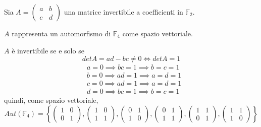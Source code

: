 \documentclass[../main.tex]{subfiles}
\begin{document}
\begin{example}
    Sia $A = \begin{pmatrix}
            a & b \\
            c & d
        \end{pmatrix}$ una matrice invertibile a coefficienti in $\mathbb{F}_2$.

    $A$ rappresenta un automorfismo di $\mathbb{F}_4$ come spazio vettoriale.

    $A$ è invertibile se e solo se
    \begin{equation*}
        det A = ad - bc \neq 0 \iff det A = 1
    \end{equation*}
    \begin{align*}
         & a = 0 \implies bc = 1 \implies b = c = 1 \\
         & b = 0 \implies ad = 1 \implies a = d = 1 \\
         & c = 0 \implies ad = 1 \implies a = d = 1 \\
         & d = 0 \implies bc = 1 \implies b = c = 1
    \end{align*}
    quindi, come spazio vettoriale,
    \begin{equation*}
        Aut(\mathbb{F}_4) = \left\{
        \begin{pmatrix}
            1 & 0 \\
            0 & 1
        \end{pmatrix},
        \begin{pmatrix}
            1 & 0 \\
            1 & 1
        \end{pmatrix},
        \begin{pmatrix}
            0 & 1 \\
            1 & 0
        \end{pmatrix},
        \begin{pmatrix}
            0 & 1 \\
            1 & 1
        \end{pmatrix},
        \begin{pmatrix}
            1 & 1 \\
            0 & 1
        \end{pmatrix},
        \begin{pmatrix}
            1 & 1 \\
            1 & 0
        \end{pmatrix}
        \right\}
    \end{equation*}

\end{example}
\end{document}
